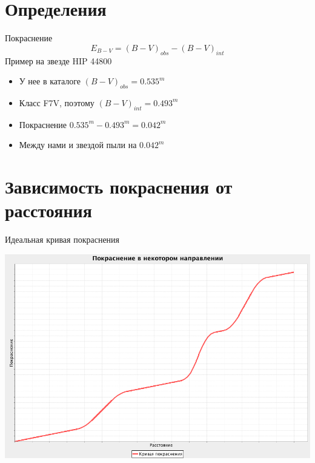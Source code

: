 \documentclass[14pt, fleqn, xcolor={dvipsnames, table}]{beamer}
\begin{document}
    \section{Определения}
        \begin{frame}{Покраснение}
            $$
                E_{B - V} = (B - V)_{obs} - (B - V)_{int}
            $$
            Пример на звезде HIP 44800
            \begin{itemize}
                \item У нее в каталоге $(B - V)_{obs} = 0.535^m$
                \item Класс F7V, поэтому $(B - V)_{int} = 0.493^m$
                \item Покраснение $0.535^m - 0.493^m = 0.042^m$
                \item Между нами и звездой пыли на $0.042^m$
            \end{itemize}
        \end{frame}

    \section{Зависимость покраснения от расстояния}    
    
        \begin{frame}{Идеальная кривая покраснения}
            \begin{center}
                \includegraphics[scale=0.35]{ideal-1-no-tick.png}
            \end{center}             
        \end{frame}
        
\end{document}
